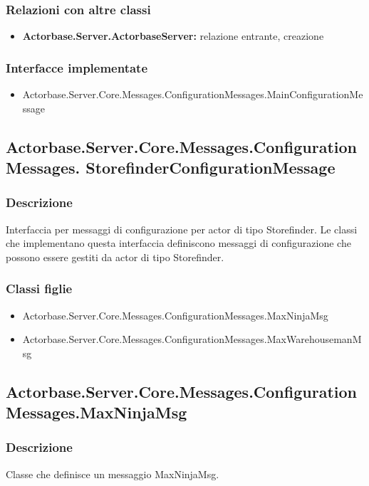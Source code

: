 \documentclass[a4paper]{article}
\begin{document}
			\subsubsection{Relazioni con altre classi}
			\begin{itemize}
				\item \textbf{Actorbase.Server.ActorbaseServer:} relazione entrante, creazione
			\end{itemize}
			\subsubsection{Interfacce implementate}
			\begin{itemize}
				\item Actorbase.Server.Core.Messages.ConfigurationMessages.MainConfigurationMessage
			\end{itemize}

			\subsection{Actorbase.Server.Core.Messages.ConfigurationMessages.
			StorefinderConfigurationMessage}
			\subsubsection{Descrizione}
				Interfaccia per messaggi di configurazione per actor di tipo Storefinder. 
				Le classi che implementano questa interfaccia definiscono messaggi di configurazione che possono essere gestiti da actor di tipo Storefinder.
			\subsubsection{Classi figlie}
			\begin{itemize}
				\item Actorbase.Server.Core.Messages.ConfigurationMessages.MaxNinjaMsg
				\item Actorbase.Server.Core.Messages.ConfigurationMessages.MaxWarehousemanMsg
			\end{itemize}

			\subsection{Actorbase.Server.Core.Messages.ConfigurationMessages.MaxNinjaMsg}
			\subsubsection{Descrizione}
				Classe che definisce un messaggio MaxNinjaMsg.
\end{document}
